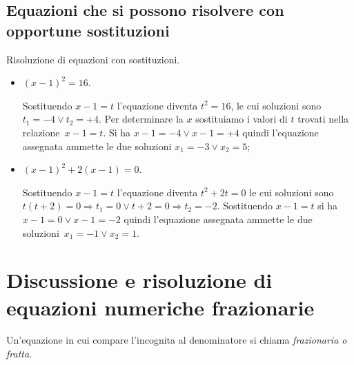 \vspazio\ovalbox{\risolvii \ref{ese:3.25}, \ref{ese:3.26}, \ref{ese:3.27}, \ref{ese:3.28}, \ref{ese:3.29}, \ref{ese:3.30}, \ref{ese:3.31}, \ref{ese:3.32}, \ref{ese:3.33}, \ref{ese:3.34}, \ref{ese:3.35}}

\subsection{Equazioni che si possono risolvere con opportune sostituzioni}

\begin{exrig}
\begin{esempio}
Risoluzione di equazioni con sostituzioni.
\begin{itemize}
\item $( x - 1 )^{2} = 16$.

Sostituendo $x - 1 = t$ l'equazione diventa $t^{2} = 16$, le cui soluzioni sono $t_{1} = - 4 \vee t_{2} = + 4$. Per determinare la $x$ sostituiamo i valori di $t$ trovati nella relazione~$x - 1 = t$. Si ha $x - 1 = - 4 \vee x - 1 = + 4$ quindi l'equazione assegnata ammette le due soluzioni
$x_{1} = - 3 \vee x_{2} = 5$;
\item $( x - 1 )^{2} + 2 ( x - 1 ) = 0$.

Sostituendo $x - 1 = t$ l'equazione diventa $t^{2} + 2t = 0$ le cui soluzioni sono $t ( t + 2 ) = 0 \Rightarrow t_{1} = 0 \vee t + 2 = 0 \Rightarrow t_{2} = - 2$. Sostituendo $x - 1 = t$ si ha $x - 1 = 0 \vee x - 1 = - 2$ quindi l'equazione assegnata ammette le due soluzioni~$x_{1} = - 1 \vee x_{2} = 1$.
\end{itemize}
\end{esempio}
\end{exrig}
\vspazio\ovalbox{\risolvii \ref{ese:3.36}, \ref{ese:3.37}, \ref{ese:3.38}}

\section{Discussione e risoluzione di equazioni numeriche frazionarie}

Un'equazione in cui compare l'incognita al denominatore si chiama \emph{frazionaria o fratta.}

